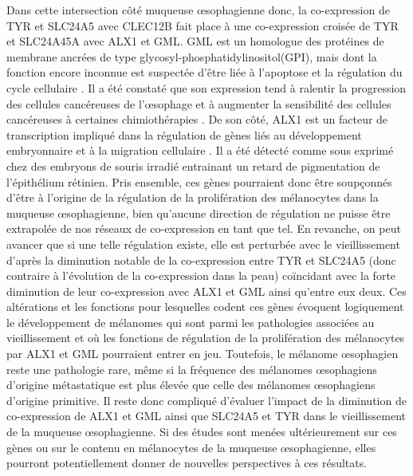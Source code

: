 Dans cette intersection côté muqueuse œsophagienne donc, la co-expression de TYR et SLC24A5 avec CLEC12B fait place à une co-expression croisée de TYR et SLC24A45A avec ALX1 et GML. 
GML est un homologue des protéines de membrane ancrées de type glycosyl-phosphatidylinositol(GPI), mais dont la fonction encore inconnue est suspectée d'être liée à l'apoptose et la régulation du cycle cellulaire . Il a été constaté que son expression tend à ralentir la progression des cellules cancéreuses de l'œsophage et à augmenter la sensibilité des cellules cancéreuses à certaines chimiothérapies . 
De son côté, ALX1 est un facteur de transcription impliqué dans la régulation de gènes liés au développement embryonnaire et à la migration cellulaire . Il a été détecté comme sous exprimé chez des embryons de souris irradié entrainant un retard de pigmentation de l'épithélium rétinien. 
Pris ensemble, ces gènes pourraient donc être soupçonnés d'être à l'origine de la régulation de la prolifération des mélanocytes dans la muqueuse œsophagienne, bien qu'aucune direction de régulation ne puisse être extrapolée de nos réseaux de co-expression en tant que tel. En revanche, on peut avancer que si une telle régulation existe, elle est perturbée avec le vieillissement d'après la diminution notable de la co-expression entre TYR et SLC24A5 (donc contraire à l'évolution de la co-expression dans la peau) coïncidant avec la forte diminution de leur co-expression avec ALX1 et GML ainsi qu'entre eux deux. 
Ces altérations et les fonctions pour lesquelles codent ces gènes évoquent logiquement le développement de mélanomes qui sont parmi les pathologies associées au vieillissement et où les fonctions de régulation de la prolifération des mélanocytes par ALX1 et GML pourraient entrer en jeu. Toutefois, le mélanome œsophagien reste une pathologie rare, même si la fréquence des mélanomes œsophagiens d'origine métastatique est plus élevée que celle des mélanomes œsophagiens d'origine primitive. Il reste donc compliqué d'évaluer l'impact de la diminution de co-expression de ALX1 et GML ainsi que SLC24A5 et TYR dans le vieillissement de la muqueuse œsophagienne. Si des études sont menées ultérieurement sur ces gènes ou sur le contenu en mélanocytes de la muqueuse œsophagienne, elles pourront potentiellement donner de nouvelles perspectives à ces résultats.

